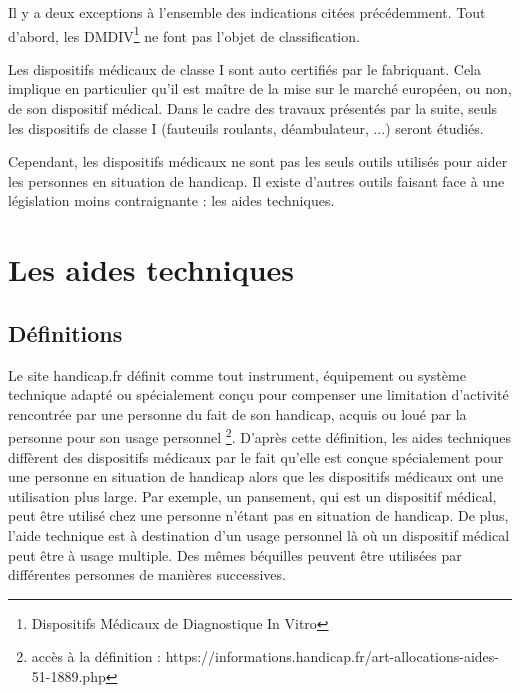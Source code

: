Il y a deux exceptions à l'ensemble des indications citées précédemment. Tout d'abord, les DMDIV\footnote{Dispositifs Médicaux de Diagnostique In Vitro} ne font pas l'objet de classification.

Les dispositifs médicaux de classe I sont auto certifiés par le fabriquant. Cela implique en particulier qu'il est maître de la mise sur le marché européen, ou non, de son dispositif médical. Dans le cadre des travaux présentés par la suite, seuls les dispositifs de classe I (fauteuils roulants, déambulateur, ...) seront étudiés.

Cependant, les dispositifs médicaux ne sont pas les seuls outils utilisés pour aider les personnes en situation de handicap. Il existe d'autres outils faisant face à une législation moins contraignante : les aides techniques.

\section{Les aides techniques}
\subsection{Définitions}
Le site handicap.fr définit comme \og tout instrument, équipement ou système technique adapté ou spécialement conçu pour compenser une limitation d'activité rencontrée par une personne du fait de son handicap, acquis ou loué par la personne pour son usage personnel \fg \footnote{accès à la définition : https://informations.handicap.fr/art-allocations-aides-51-1889.php}. D'après cette définition, les aides techniques diffèrent des dispositifs médicaux par le fait qu'elle est conçue spécialement pour une personne en situation de handicap alors que les dispositifs médicaux ont une utilisation plus large. Par exemple, un pansement, qui est un dispositif médical, peut être utilisé chez une personne n'étant pas en situation de handicap. De plus, l'aide technique est à destination d'un usage personnel là où un dispositif médical peut être à usage multiple. Des mêmes béquilles peuvent être utilisées par différentes personnes de manières successives.

